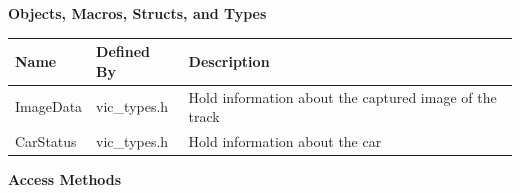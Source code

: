\documentclass [10pt]{article}
\begin{document}
\textbf{Objects, Macros, Structs, and Types}
\begin{longtable}{ p{ }  p{ } p{}} \\ 

\rowcolor{tableCell} \textbf{Name} & \textbf{Defined By} & \textbf{Description} \\ \hline

\rowcolor{tableCell} ImageData & vic\_types.h &  Hold  information about the captured image of the track \\ \hline
\rowcolor{tableCell} CarStatus & vic\_types.h & Hold information about the car  \\ \hline


\end{longtable}



 





 


\textbf{Access Methods} 
\end{document}

